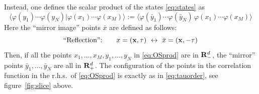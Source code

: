 Instead, one defines the scalar product of the states \eqref{eq:states} as
\begin{equation}\label{eq:OSprod}
\bigl\langle\varphi(y_1)\cdots\varphi(y_N)\big|\varphi(x_1)\cdots\varphi(x_M)\bigr\rangle
:=\bigl\langle\varphi(\bar y_1)\cdots\varphi(\bar y_N)\,\varphi(x_1)\cdots\varphi(x_M)\bigr\rangle
\end{equation}
Here the ``mirror image'' points $\bar x$ are defined as follows:
\begin{equation}\label{eq:reflection}
\text{``Reflection'':}\qquad x=(\mathbf{x},\tau)\ \leftrightarrow\ \bar x=(\mathbf{x},-\tau)
\end{equation}
Then, if all the points $x_1,\dots,x_M,y_1,\dots,y_N$ in \eqref{eq:OSprod} are in
$\mathbf{R}^d_-$, the ``mirror'' points $\bar y_1,\dots,\bar y_N$ are all in $\mathbf{R}^d_+$. The
configuration of the points in the correlation function in the r.h.s.\ of
\eqref{eq:OSprod} is exactly as in \eqref{eq:tauorder}, see figure~\ref{fig:slice}
above.

